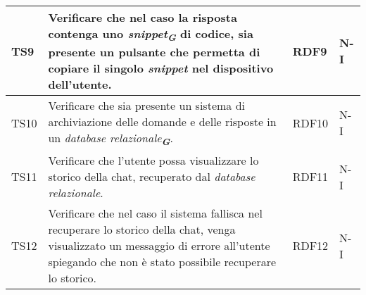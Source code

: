 \begin{table}[h!]
\begin{tabularx}{\textwidth}{|p{}|X|p{}|p{}|}
    TS9 & Verificare che nel caso la risposta contenga uno \emph{snippet}\textsubscript{\textit{\textbf{G}}} di codice, sia presente un pulsante che permetta di copiare il singolo \emph{snippet} nel dispositivo dell'utente. & RDF9 & N-I \\ \hline
    TS10 & Verificare che sia presente un sistema di archiviazione delle domande e delle risposte in un \emph{database relazionale}\textsubscript{\textit{\textbf{G}}}. & RDF10 & N-I \\ \hline
    TS11 & Verificare che l'utente possa visualizzare lo storico della chat, recuperato dal \emph{database relazionale}. & RDF11 & N-I \\ \hline
    TS12 & Verificare che nel caso il sistema fallisca nel recuperare lo storico della chat, venga visualizzato un messaggio di errore all'utente spiegando che non è stato possibile recuperare lo storico. & RDF12 & N-I \\ \hline
   \end{tabularx}
\end{table}

\newpage

